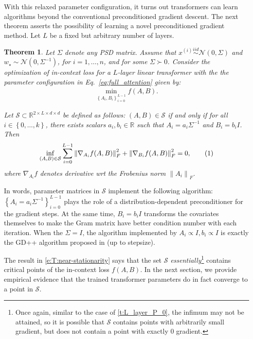 \documentclass{article}
\newcommand{\R}{\mathbb{R}}
\renewcommand{\S}{{\mathcal S}}
\newtheorem{theorem}{Theorem}
\newcommand{\wstar}{w_\star}
\newcommand{\tx}[1]{x^{(#1)}}
\newcommand*\lrn[1]{\left\| #1 \right\|}
\newcommand*\lrp[1]{\left( #1 \right)}
\newcommand*\lrbb[1]{\left\{ #1 \right\}}
\newcommand\numberthis{\addtocounter{equation}{1}\tag{\theequation}}
\begin{document}
With this relaxed parameter configuration, it turns out transformers can learn algorithms beyond the conventional preconditioned gradient descent. The next theorem asserts the possibility of learning a novel preconditioned gradient method. Let $L$ be a fixed but arbitrary number of layers. 

\begin{theorem}\label{t:L_layer_P_identity}
Let $\Sigma$ denote any PSD matrix. Assume that $\tx{i} \overset{iid}{\sim} \mathcal{N}(0,\Sigma)$ and $\wstar \sim \mathcal{N}(0,\Sigma^{-1})$, for $i=1, \dots, n$, and for some $\Sigma \succ 0$. Consider the optimization of in-context loss for a $L$-layer linear transformer with the the parameter configuration in Eq.~\eqref{eq:full_attention} given by:
\begin{align}
\min_{\lrbb{A_i,B_i}_{i=0}^{L-1}} f \lrp{A,B}.
\end{align}

Let $\S \subset \R^{2\times L \times d \times d}$ be defined as follows: $(A,B) \in \S$ if and only if for all $i\in \lrbb{0,\dots,k}$, there exists scalars $a_i,b_i \in \R$ such that $A_i = a_i \Sigma^{-1}$ and $B_i = b_i I$. Then
\begin{align*}
\inf_{(A,B) \in \S} \sum_{i=0}^{L-1} \lrn{\nabla_{A_i} f(A,B)}_F^2 + \lrn{\nabla_{B_i} f(A,B)}_F^2 = 0,
\numberthis \label{e:T:near-stationarity}
\end{align*}
where $\nabla_{A_i} f$ denotes derivative wrt the Frobenius norm $\lrn{A_i}_F$.
\end{theorem}
In words, parameter matrices in $\S$ implement the following  algorithm: $\lrbb{A_i = a_i \Sigma^{-1}}_{i=0}^{L-1}$ plays the role of a distribution-dependent preconditioner for the gradient steps. At the same time, $B_i = b_i I$ transforms the covariates themselves to make the Gram matrix have better condition number with each iteration. When the $\Sigma = I$, the algorithm implemented by $A_i \propto I, b_i \propto I$ is exactly the GD++ algorithm proposed in \citep{von2022transformers} (up to stepsize).

The result in \eqref{e:T:near-stationarity} says that the set $\S$ \emph{essentially}\footnote{Once again, similar to the case of \autoref{t:L_layer_P_0}, the infimum may not be attained, so it is possible that $\S$ contains points with arbitrarily small gradient, but does not contain a point with exactly $0$ gradient.} contains critical points of the in-context loss $f(A,B)$. In the next section, we provide empirical evidence that the trained transformer parameters do in fact converge to a point in $\S$.
\end{document}
